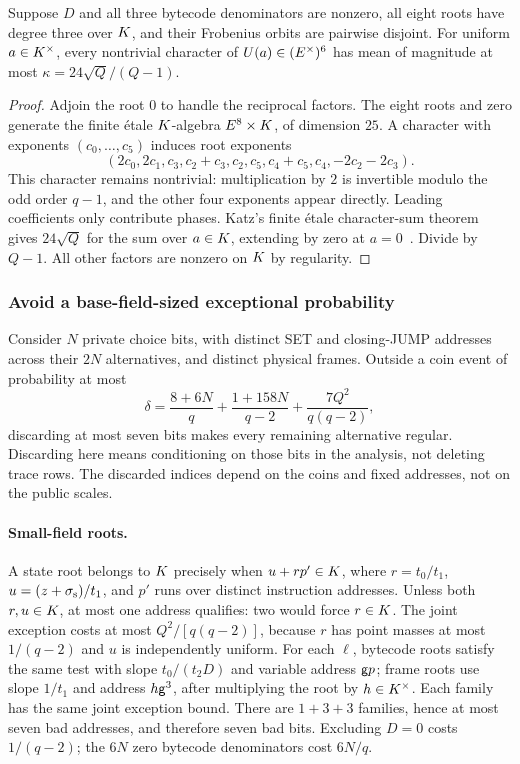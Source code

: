 \begin{lemma}
Suppose $D$ and all three bytecode denominators are nonzero, all eight roots have degree three over $K$, and their Frobenius orbits are pairwise disjoint. For uniform $a\in K^\times$, every nontrivial character of $U(a)\in(E^\times)^6$ has mean of magnitude at most $\kappa=24\sqrt Q/(Q-1)$.
\end{lemma}
\begin{proof}
Adjoin the root $0$ to handle the reciprocal factors. The eight roots and zero generate the finite \'etale $K$-algebra $E^8\times K$, of dimension $25$. A character with exponents $(c_0,\ldots,c_5)$ induces root exponents
\[
 (2c_0,2c_1,c_3,c_2+c_3,c_2,c_5,c_4+c_5,c_4,-2c_2-2c_3).
\]
This character remains nontrivial: multiplication by $2$ is invertible modulo the odd order $q-1$, and the other four exponents appear directly. Leading coefficients only contribute phases. Katz's finite \'etale character-sum theorem gives $24\sqrt Q$ for the sum over $a\in K$, extending by zero at $a=0$~\cite{katz}. Divide by $Q-1$. All other factors are nonzero on $K$ by regularity.
\end{proof}

\subsubsection{Avoid a base-field-sized exceptional probability}

Consider $N$ private choice bits, with distinct SET and closing-JUMP addresses across their $2N$ alternatives, and distinct physical frames. Outside a coin event of probability at most
\[
 \delta=\frac{8+6N}{q}+\frac{1+158N}{q-2}
              +\frac{7Q^2}{q(q-2)},
\]
discarding at most seven bits makes every remaining alternative regular. Discarding here means conditioning on those bits in the analysis, not deleting trace rows. The discarded indices depend on the coins and fixed addresses, not on the public scales.

\paragraph{Small-field roots.} A state root belongs to $K$ precisely when $u+rp'\in K$, where $r=t_0/t_1$, $u=(z+\sigma_{\rm s})/t_1$, and $p'$ runs over distinct instruction addresses. Unless both $r,u\in K$, at most one address qualifies: two would force $r\in K$. The joint exception costs at most $Q^2/[q(q-2)]$, because $r$ has point masses at most $1/(q-2)$ and $u$ is independently uniform. For each $\ell$, bytecode roots satisfy the same test with slope $t_0/(t_2D)$ and variable address $\mathsf{g} p$; frame roots use slope $1/t_1$ and address $h\mathsf{g}^3$, after multiplying the root by $h\in K^\times$. Each family has the same joint exception bound. There are $1+3+3$ families, hence at most seven bad addresses, and therefore seven bad bits. Excluding $D=0$ costs $1/(q-2)$; the $6N$ zero bytecode denominators cost $6N/q$.

